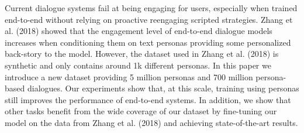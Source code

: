 Current dialogue systems fail at being engaging for users, especially when trained end-to-end without relying on proactive reengaging scripted strategies. Zhang et al. (2018) showed that the engagement level of end-to-end dialogue models increases when conditioning them on text personas providing some personalized back-story to the model. However, the dataset used in Zhang et al. (2018) is synthetic and only contains around 1k different personas. In this paper we introduce a new dataset providing 5 million personas and 700 million persona-based dialogues. Our experiments show that, at this scale, training using personas still improves the performance of end-to-end systems. In addition, we show that other tasks benefit from the wide coverage of our dataset by fine-tuning our model on the data from Zhang et al. (2018) and achieving state-of-the-art results.
